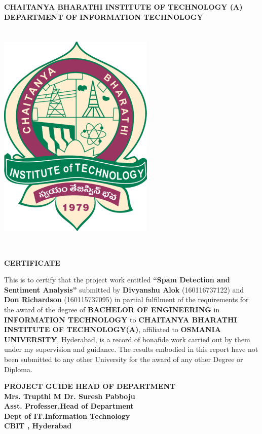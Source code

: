 \vspace{0.5cm}
\begin{center}
	\textsc{\Large \bfseries CHAITANYA BHARATHI INSTITUTE OF TECHNOLOGY (A)}\\[0.3cm]
\textsc{\Large \bfseries DEPARTMENT OF INFORMATION TECHNOLOGY}\\[0.3cm]
\\[0.3cm]
\\[1.5cm]
\includegraphics [width=40 mm]{cbit.png}\\[1.5cm]
\end{center}\

\centerline{\Large \bfseries CERTIFICATE}
\vspace{0.5in}
\large{
This is to certify that the project work entitled \textbf{“Spam Detection and Sentiment Analysis”} submitted by \textbf{Divyanshu Alok} (160116737122) and \textbf{Don Richardson} (160115737095) in partial fulfilment of the requirements for the award of the degree of \textbf{BACHELOR OF ENGINEERING} in \textbf{INFORMATION TECHNOLOGY} to \textbf{CHAITANYA BHARATHI INSTITUTE OF TECHNOLOGY(A)}, affiliated to \textbf{OSMANIA UNIVERSITY}, Hyderabad, is a record of bonafide work carried out by them under my supervision and guidance. The results embodied in this report have not been submitted to any other University for the award of any other Degree or Diploma.

\vspace{1.5in}
\bfseries
\noindent PROJECT GUIDE \hfill HEAD OF DEPARTMENT \\
\noindent \normalfont \textbf{ Mrs. Trupthi M } \hfill \textbf{Dr. Suresh Pabboju}\\
\noindent \normalfont Asst. Professer,\hfill \normalfont Head of Department\\
\noindent \normalfont Dept of IT.\hfill \normalfont Information Technology\\
\noindent \null \hfill \normalfont CBIT , Hyderabad



\vspace{1in}

\vspace{1.5in}
% 
}
\newpage
